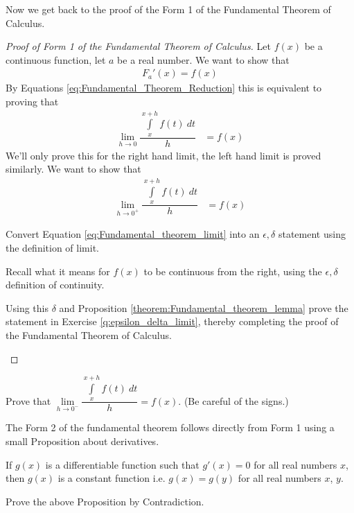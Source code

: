 Now we get back to the proof of the Form 1 of the Fundamental Theorem of Calculus.
\begin{proof}[Proof of Form 1 of the Fundamental Theorem of Calculus]
	Let $f(x)$ be a continuous function, let $a$ be a real number. We want to show that
	\begin{align*}
		F_a'(x) = f(x)
	\end{align*}
	By Equations \eqref{eq:Fundamental_Theorem_Reduction} this is equivalent to proving that
	\begin{align*}
		\lim \limits_{h \rightarrow 0}\dfrac{\int \limits_x^{x+h} f(t) \:dt}{h}
		 & = f(x)
	\end{align*}
	We'll only prove this for the right hand limit, the left hand limit is proved similarly. We want to show that
	\begin{align}
		\label{eq:Fundamental_theorem_limit}
		\lim \limits_{h \rightarrow 0^+}\dfrac{\int \limits_x^{x+h} f(t) \:dt}{h}
		 & = f(x)
	\end{align}
	\begin{exercise}
		\label{q:epsilon_delta_limit}
		Convert Equation \eqref{eq:Fundamental_theorem_limit} into an $\epsilon, \delta$ statement using the definition of limit.
	\end{exercise}

	\begin{exercise}
		Recall what it means for $f(x)$ to be continuous from the right, using the  $\epsilon, \delta$ definition of continuity.
	\end{exercise}

	\begin{exercise}
		Using this $\delta$ and Proposition \ref{theorem:Fundamental_theorem_lemma} prove the statement in Exercise \ref{q:epsilon_delta_limit}, thereby completing the proof of the Fundamental Theorem of Calculus.
	\end{exercise}
\end{proof}

\begin{exercise}[{\bf Optional}]
	Prove that $\lim \limits_{h \rightarrow 0^-}\dfrac{\int \limits_x^{x+h} f(t) \:dt}{h}
	= f(x)$. (Be careful of the signs.)
\end{exercise}


The Form 2 of the fundamental theorem follows directly from Form 1 using a small Proposition about derivatives.
\begin{prop}
	\label{theorem:Fundamental_theorem_lemma2}
	If $g(x)$ is a differentiable function such that $g'(x) = 0$ for all real numbers $x$, then $g(x)$ is a constant function i.e. $g(x) = g(y)$ for all real numbers $x$, $y$.
\end{prop}
\begin{exercise}
	Prove the above Proposition by Contradiction.
\end{exercise}

